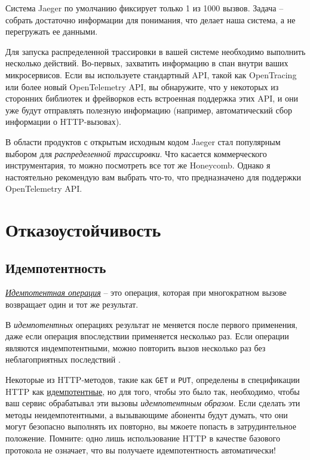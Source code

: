 \documentclass[%
	11pt,
	a4paper,
	utf8,
		]{article}
\begin{document}
Система Jaeger по умолчанию фиксирует только 1 из 1000 вызвов. Задача -- собрать достаточно информации для понимания, что делает наша система, а не перегружать ее данными.

Для запуска распределенной трассировки в вашей системе необходимо выполнить несколько действий. Во-первых, захватить информацию в спан внутри ваших микросервисов. Если вы используете стандартный API, такой как OpenTracing или более новый OpenTelemetry API, вы обнаружите, что у некоторых из сторонних библиотек и фрейворков есть встроенная поддержка этих API, и они уже будут отправлять полезную информацию (например, автоматический сбор информации о HTTP-вызовах). 

В области продуктов с открытым исходным кодом Jaeger стал популярным выбором для \emph{распределенной трассировки}. Что касается коммерческого инструментария, то можно посмотреть все тот же Honeycomb. Однако я настоятельно рекомендую вам выбрать что-то, что предназначено для поддержки OpenTelemetry API. 

\section{Отказоустойчивость}

\subsection{Идемпотентность}

\href{https://yandex.cloud/ru/docs/api-design-guide/concepts/idempotency?utm_referrer=https%3A%2F%2Fyandex.ru%2F}{\emph{Идемпотентная операция}} -- это операция, которая при многократном вызове возвращает один и тот же результат.

В \emph{идемпотентных} операциях результат не меняется после первого применения, даже если операция впоследствии применяется несколько раз. Если операции являются индемпотентными, можно повторить вызов несколько раз без неблагоприятных последствий \cite[]{microservices-2024}.

Некоторые из HTTP-методов, такие как \verb|GET| и \verb|PUT|, определены в спецификации HTTP как \underline{идемпотентные}, но для того, чтобы это было так, необходимо, чтобы ваш сервис обрабатывал эти вызовы \emph{идемпотентным образом}. Если сделать эти методы неидемпотентными, а вызывающиме абоненты будут думать, что они могут безопасно выполнять их повторно, вы мжоете попасть в затрудинтельное положение. Помните: одно лишь использование HTTP в качестве базового протокола не означает, что вы получаете идемпотентность автоматически!
\end{document}
